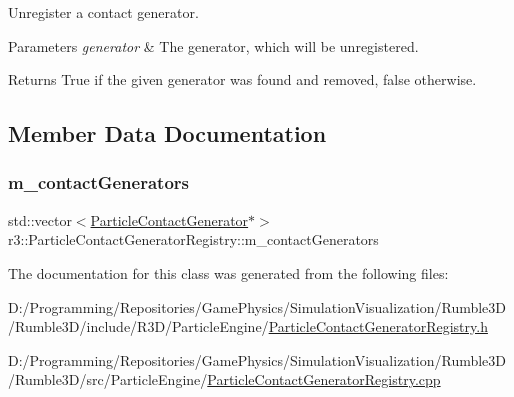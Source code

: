 Unregister a contact generator. 


\begin{DoxyParams}{Parameters}
{\em generator} & The generator, which will be unregistered. \\
\hline
\end{DoxyParams}
\begin{DoxyReturn}{Returns}
True if the given generator was found and removed, false otherwise. 
\end{DoxyReturn}


\subsection{Member Data Documentation}
\mbox{\label{classr3_1_1_particle_contact_generator_registry_abefd730c20539681ed0fac53ccd5f8ab}} 
\subsubsection{\texorpdfstring{m\+\_\+contact\+Generators}{m\_contactGenerators}}
{\footnotesize\ttfamily std\+::vector$<$\mbox{\hyperlink{classr3_1_1_particle_contact_generator}{Particle\+Contact\+Generator}}$\ast$$>$ r3\+::\+Particle\+Contact\+Generator\+Registry\+::m\+\_\+contact\+Generators\hspace{0.3cm}{\ttfamily [protected]}}



The documentation for this class was generated from the following files\+:\begin{DoxyCompactItemize}
\item 
D\+:/\+Programming/\+Repositories/\+Game\+Physics/\+Simulation\+Visualization/\+Rumble3\+D/\+Rumble3\+D/include/\+R3\+D/\+Particle\+Engine/\mbox{\hyperlink{_particle_contact_generator_registry_8h}{Particle\+Contact\+Generator\+Registry.\+h}}\item 
D\+:/\+Programming/\+Repositories/\+Game\+Physics/\+Simulation\+Visualization/\+Rumble3\+D/\+Rumble3\+D/src/\+Particle\+Engine/\mbox{\hyperlink{_particle_contact_generator_registry_8cpp}{Particle\+Contact\+Generator\+Registry.\+cpp}}\end{DoxyCompactItemize}
